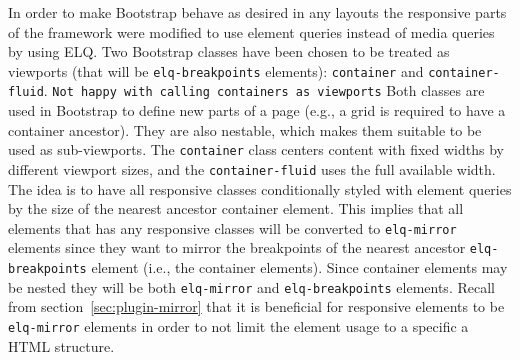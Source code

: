 \documentclass[a4paper,11pt]{kth-mag}
\newcommand{\code}[1]{\texttt{#1}}
\begin{document}

      In order to make \gls{Bootstrap} behave as desired in any layouts the \gls{responsive} parts of the framework were modified to use element queries instead of \gls{media queries} by using \gls{ELQ}.
      Two \gls{Bootstrap} classes have been chosen to be treated as \glspl{viewport} (that will be \code{elq-breakpoints} \glspl{element}): \code{container} and \code{container-fluid}.
      \code{Not happy with calling containers as \glspl{viewport}}
      Both classes are used in \gls{Bootstrap} to define new parts of a page (e.g., a grid is required to have a container ancestor).
      They are also nestable, which makes them suitable to be used as sub-\glspl{viewport}.
      The \code{container} class centers content with fixed widths by different \gls{viewport} sizes, and the \code{container-fluid} uses the full available width.
      The idea is to have all \gls{responsive} classes conditionally styled with element queries by the size of the nearest ancestor container \gls{element}.
      This implies that all \glspl{element} that has any \gls{responsive} classes will be converted to \code{elq-mirror} \glspl{element} since they want to mirror the breakpoints of the nearest ancestor \code{elq-breakpoints} element (i.e., the container \glspl{element}).
      Since container \glspl{element} may be nested they will be both \code{elq-mirror} and \code{elq-breakpoints} \glspl{element}.
      Recall from section~\ref{sec:plugin-mirror} that it is beneficial for \gls{responsive} \glspl{element} to be \code{elq-mirror} \glspl{element} in order to not limit the element usage to a specific a \gls{HTML} structure.
\end{document}

